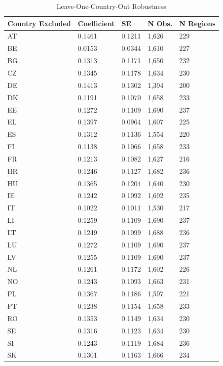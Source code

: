 \begin{table}

\caption{\label{tab:loo}Leave-One-Country-Out Robustness}
\centering
\begin{tabular}[t]{lllll}
\toprule
Country Excluded & Coefficient & SE & N Obs. & N Regions\\
\midrule
AT & 0.1461 & 0.1211 & 1,626 & 229\\
BE & 0.0153 & 0.0344 & 1,610 & 227\\
BG & 0.1313 & 0.1171 & 1,650 & 232\\
CZ & 0.1345 & 0.1178 & 1,634 & 230\\
DE & 0.1413 & 0.1302 & 1,394 & 200\\
\addlinespace
DK & 0.1191 & 0.1070 & 1,658 & 233\\
EE & 0.1272 & 0.1109 & 1,690 & 237\\
EL & 0.1397 & 0.0964 & 1,607 & 225\\
ES & 0.1312 & 0.1136 & 1,554 & 220\\
FI & 0.1138 & 0.1066 & 1,658 & 233\\
\addlinespace
FR & 0.1213 & 0.1082 & 1,627 & 216\\
HR & 0.1246 & 0.1127 & 1,682 & 236\\
HU & 0.1365 & 0.1204 & 1,640 & 230\\
IE & 0.1242 & 0.1092 & 1,692 & 235\\
IT & 0.1022 & 0.1011 & 1,530 & 217\\
\addlinespace
LI & 0.1259 & 0.1109 & 1,690 & 237\\
LT & 0.1249 & 0.1099 & 1,688 & 236\\
LU & 0.1272 & 0.1109 & 1,690 & 237\\
LV & 0.1255 & 0.1109 & 1,690 & 237\\
NL & 0.1261 & 0.1172 & 1,602 & 226\\
\addlinespace
NO & 0.1243 & 0.1093 & 1,663 & 231\\
PL & 0.1367 & 0.1186 & 1,597 & 221\\
PT & 0.1238 & 0.1154 & 1,658 & 233\\
RO & 0.1353 & 0.1149 & 1,634 & 230\\
SE & 0.1316 & 0.1123 & 1,634 & 230\\
\addlinespace
SI & 0.1243 & 0.1119 & 1,684 & 236\\
SK & 0.1301 & 0.1163 & 1,666 & 234\\
\bottomrule
\end{tabular}
\end{table}
